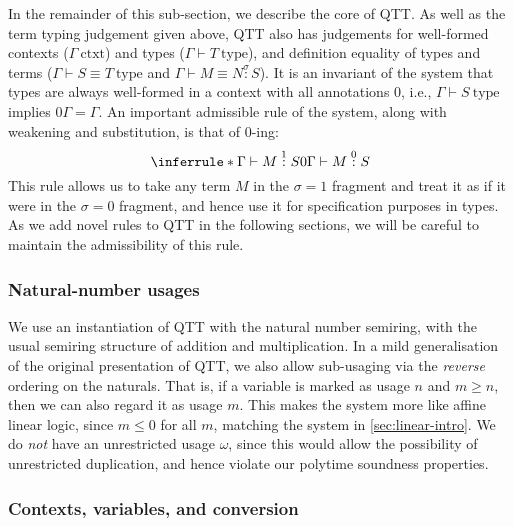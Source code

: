 \documentclass[acmsmall,review,screen,anonymous]{acmart}
\newcommand{\istype}{\mathrm{type}}
\newcommand{\isctxt}{\mathrm{ctxt}}
\begin{document}
In the remainder of this sub-section, we describe the core of QTT. As
well as the term typing judgement given above, QTT also has judgements
for well-formed contexts ($\Gamma~\isctxt$) and types
($\Gamma \vdash T~\istype$), and definition equality of types and
terms ($\Gamma \vdash S \equiv T~\istype$ and
$\Gamma \vdash M \equiv N \stackrel\sigma: S$). It is an invariant of
the system that types are always well-formed in a context with all
annotations $0$, i.e., $\Gamma \vdash S~\istype$ implies
$0\Gamma = \Gamma$. An important admissible rule of the system, along
with weakening and substitution, is that of $0$-ing:
\begin{displaymath}
  \inferrule*
  {\Gamma \vdash M \stackrel1: S}
  {0\Gamma \vdash M \stackrel0: S}
\end{displaymath}
This rule allows us to take any term $M$ in the $\sigma = 1$ fragment
and treat it as if it were in the $\sigma = 0$ fragment, and hence use
it for specification purposes in types. As we add novel rules to QTT
in the following sections, we will be careful to maintain the
admissibility of this rule.

\subsubsection{Natural-number usages}

We use an instantiation of QTT with the natural number semiring, with
the usual semiring structure of addition and multiplication. In a mild
generalisation of the original presentation of QTT, we also allow
sub-usaging via the \emph{reverse} ordering on the naturals. That is,
if a variable is marked as usage $n$ and $m \geq n$, then we can also
regard it as usage $m$. This makes the system more like affine linear
logic, since $m \leq 0$ for all $m$, matching the system in
\autoref{sec:linear-intro}. We do \emph{not} have an unrestricted
usage $\omega$, since this would allow the possibility of unrestricted
duplication, and hence violate our polytime soundness properties.

\subsubsection{Contexts, variables, and conversion}
\end{document}

